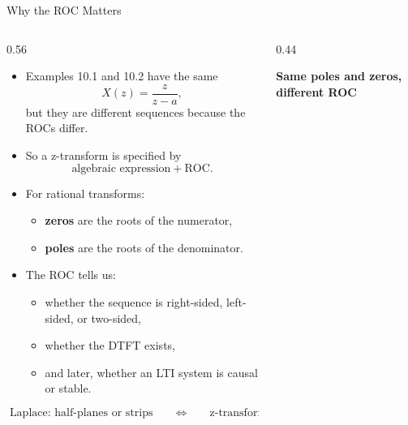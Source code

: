 \begin{frame}[t]{Why the ROC Matters}
  \footnotesize
  \begin{columns}[T]
    \begin{column}{0.56\textwidth}
      \begin{itemize}
        \item Examples 10.1 and 10.2 have the same
          \[
            X(z)=\frac{z}{z-a},
          \]
          but they are different sequences because the ROCs differ.
        \item So a z-transform is specified by
          \[
            \text{algebraic expression} + \text{ROC}.
          \]
        \item For rational transforms:
          \begin{itemize}
            \item \textbf{zeros} are the roots of the numerator,
            \item \textbf{poles} are the roots of the denominator.
          \end{itemize}
        \item The ROC tells us:
          \begin{itemize}
            \item whether the sequence is right-sided, left-sided, or two-sided,
            \item whether the DTFT exists,
            \item and later, whether an LTI system is causal or stable.
          \end{itemize}
      \end{itemize}
      \[
        \text{Laplace: half-planes or strips}
        \qquad \Longleftrightarrow \qquad
        \text{z-transform: disks, exteriors, annuli}
      \]
    \end{column}
    \begin{column}{0.44\textwidth}
      \begin{center}
        \textbf{Same poles and zeros, different ROC}\\[0.05cm]
\end{center}
\end{column}
\end{columns}
\end{frame}
